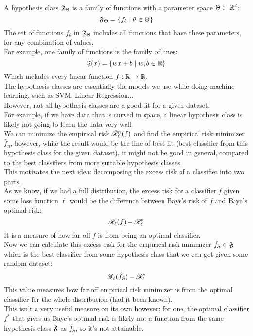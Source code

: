 \documentclass[12pt]{article}
\begin{document}
A hypothesis class $\mathfrak{F}_\Theta$
is a family of functions
with a parameter space $\Theta \subset \mathbb{R}^d$:
\[ \mathfrak{F}_\Theta = 
\{ f_\theta \mid \theta \in \Theta \} \]
The set of functions $f_\theta$ in $\mathfrak{F}_\Theta$
includes all functions that have these parameters,
for any combination of values. \\

For example, one family of functions is the
family of lines:
\[ \mathfrak{F}(x) = \{ wx + b \mid w, b \in \mathbb{R} \} \]
Which includes every linear function
$f: \mathbb{R} \to \mathbb{R}$. \\

The hypothesis classes are essentially
the models we use while doing machine learning,
such as SVM, Linear Regression... \\

However, not all hypothesis
classes are a good fit for a given dataset. \\
For example, if we have data that is curved
in space,
a linear hypothesis class is likely not
going to learn the data very well. \\
We can minimize the empirical risk 
$\hat{\mathscr{R}}_\ell^n(f)$ and find the
empirical risk minimizer $\hat{f}_n$,
however, while the result would be the line
of best fit (best classifier
from this hypothesis class for the given dataset),
it might not be good in general,
compared to the best classifiers from more
suitable hypothesis classes. \\

This motivates the next idea:
decomposing the excess risk
of a classifier into two parts. \\

As we know,
if we had a full distribution,
the excess risk for a classifier $f$
given some loss function $\ell$
would be the difference between
Baye's risk of $f$ and Baye's optimal
risk:
\[ \mathscr{R}_\ell(f) - \mathscr{R}_\ell^* \]
It is a measure of how far off
$f$ is from being an optimal classifier. \\

Now we can calculate this excess risk
for the empirical risk minimizer
$\hat{f}_S \in \mathfrak{F}$
which is the best classifier
from some hypothesis class that we can get
given some random dataset: 
\[ \mathscr{R}_\ell(\hat{f}_S) - \mathscr{R}_\ell^* \]
This value measures how far off
empirical risk minimizer is from
the optimal classifier for the whole distribution
(had it been known). \\
This isn't a very useful measure on its
own however; for one,
the optimal classifier $f^*$
that gives us Baye's optimal risk
is likely not a function from the
same hypothesis class $\mathfrak{F}$ as $\hat{f}_S$,
so it's not attainable. \\
\end{document}
